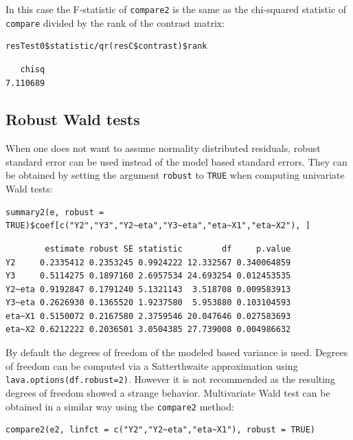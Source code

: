 \documentclass[12pt]{article}
\begin{document}
In this case the F-statistic of \texttt{compare2} is the same as the
chi-squared statistic of \texttt{compare} divided by the rank of the contrast matrix:
\lstset{language=r,label= ,caption= ,captionpos=b,numbers=none}
\begin{lstlisting}
resTest0$statistic/qr(resC$contrast)$rank
\end{lstlisting}

\begin{verbatim}
   chisq 
7.110689
\end{verbatim}

\subsection{Robust Wald tests}
\label{sec:orgf3ea70d}

When one does not want to assume normality distributed residuals,
robust standard error can be used instead of the model based standard
errors. They can be obtained by setting the argument \texttt{robust} to \texttt{TRUE}
when computing univariate Wald tests:
\lstset{language=r,label= ,caption= ,captionpos=b,numbers=none}
\begin{lstlisting}
summary2(e, robust = TRUE)$coef[c("Y2","Y3","Y2~eta","Y3~eta","eta~X1","eta~X2"), ]
\end{lstlisting}

\begin{verbatim}
        estimate robust SE statistic        df     p.value
Y2     0.2335412 0.2353245 0.9924222 12.332567 0.340064859
Y3     0.5114275 0.1897160 2.6957534 24.693254 0.012453535
Y2~eta 0.9192847 0.1791240 5.1321143  3.518708 0.009583913
Y3~eta 0.2626930 0.1365520 1.9237580  5.953880 0.103104593
eta~X1 0.5150072 0.2167580 2.3759546 20.047646 0.027583693
eta~X2 0.6212222 0.2036501 3.0504385 27.739008 0.004986632
\end{verbatim}


By default the degrees of freedom of the modeled based variance is
used. Degrees of freedom can be computed via a Satterthwaite
approximation using \texttt{lava.options(df.robust=2)}. However it is not
recommended as the resulting degrees of freedom showed a strange
behavior. Multivariate Wald test can be obtained in a similar way
using the \texttt{compare2} method:
\lstset{language=r,label= ,caption= ,captionpos=b,numbers=none}
\begin{lstlisting}
compare2(e2, linfct = c("Y2","Y2~eta","eta~X1"), robust = TRUE)
\end{lstlisting}
\end{document}
